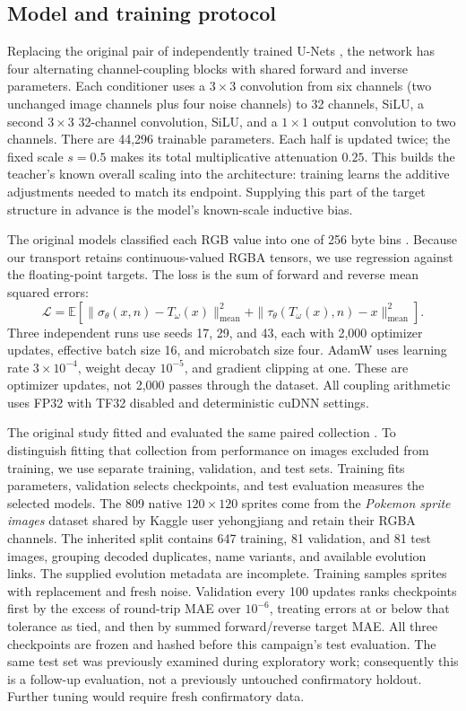 \documentclass[10pt]{article}
\begin{document}
\subsection{Model and training protocol}
Replacing the original pair of independently trained U-Nets \cite{original},
the network has four alternating channel-coupling blocks with shared forward
and inverse parameters. Each conditioner uses
a $3\times3$ convolution from six channels (two unchanged image channels plus
four noise channels) to 32 channels, SiLU, a second $3\times3$ 32-channel
convolution, SiLU, and a $1\times1$ output convolution to two channels.
There are 44,296 trainable parameters. Each half is updated twice; the fixed
scale $s=0.5$ makes its total multiplicative attenuation $0.25$. This builds the
teacher's known overall scaling into the architecture: training learns the
additive adjustments needed to match its endpoint. Supplying this part of the
target structure in advance is the model's known-scale inductive bias.

The original models classified each RGB value into one of 256 byte bins
\cite{original}. Because our transport retains continuous-valued RGBA tensors,
we use regression against the floating-point targets. The loss is the sum of
forward and reverse mean squared errors:
\begin{equation}
 \mathcal L=\mathbb E\left[\|\sigma_\theta(x,n)-T_\omega(x)\|^2_{\mathrm{mean}}
 +\|\tau_\theta(T_\omega(x),n)-x\|^2_{\mathrm{mean}}\right].
\end{equation}
Three independent runs use seeds 17, 29, and 43, each with 2,000 optimizer updates,
effective batch size 16, and microbatch size four. AdamW uses learning rate
$3\times10^{-4}$, weight decay $10^{-5}$, and gradient clipping at one.
These are optimizer updates, not 2,000 passes through the dataset. All coupling
arithmetic uses FP32 with TF32 disabled and deterministic cuDNN settings.

The original study fitted and evaluated the same paired collection
\cite{original}. To distinguish fitting that collection from performance on
images excluded from training, we use separate training, validation, and test
sets. Training fits parameters, validation selects checkpoints, and test
evaluation measures the selected models. The 809 native $120\times120$ sprites
come from the \emph{Pokemon sprite images} dataset shared by Kaggle user
yehongjiang \cite{pokemon-data} and retain their RGBA channels. The inherited
split contains 647 training, 81 validation, and 81 test images, grouping decoded
duplicates, name variants, and available evolution links. The supplied evolution
metadata are incomplete. Training samples sprites with replacement and fresh
noise. Validation every 100 updates ranks checkpoints first by the excess of
round-trip MAE over $10^{-6}$, treating errors at or below that tolerance as tied,
and then by summed forward/reverse target MAE. All three
checkpoints are frozen and hashed before this campaign's test evaluation.
The same test set was previously examined during exploratory work; consequently
this is a follow-up evaluation, not a previously untouched confirmatory holdout.
Further tuning would require fresh confirmatory data.
\end{document}
